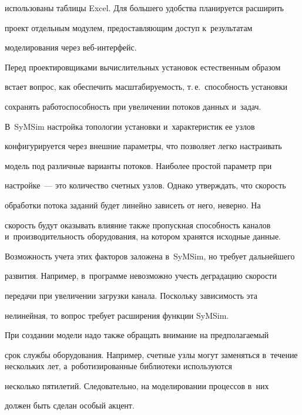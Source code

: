 использованы таблицы Excel. Для большего удобства планируется расширить


проект отдельным модулем, предоставляющим доступ к~результатам


моделирования через веб-ин\-тер\-фейс.





  Перед проектировщиками вычислительных установок естественным образом


встает вопрос, как обеспечить масштабируемость, т.\,е.\ способность установки


сохранять работоспособность при увеличении потоков данных и~задач.


В~SyMSim настройка топологии установки и~характеристик ее узлов


конфигурируется через внешние параметры, что позволяет легко настраивать


модель под различные варианты потоков. Наиболее простой параметр при


настройке~--- это количество счетных узлов. Однако утверждать, что скорость


обработки потока заданий будет линейно зависеть от него, неверно. На


скорость будут оказывать влияние также пропускная способность каналов и~производительность оборудования, на котором хранятся исходные данные.


Возможность учета этих факторов заложена в~SyMSim, но требует дальнейшего


развития. Например, в~программе невозможно учесть деградацию скорости


передачи при увеличении загрузки канала. Поскольку зависимость эта


нелинейная, то вопрос требует расширения функции SyMSim.





  При создании модели надо также обращать внимание на предполагаемый


срок службы оборудования. Например, счетные узлы могут заменяться в~течение нескольких лет, а~роботизированные библиотеки используются


несколько пятилетий. Следовательно, на моделировании процессов в~них


должен быть сделан особый акцент.











